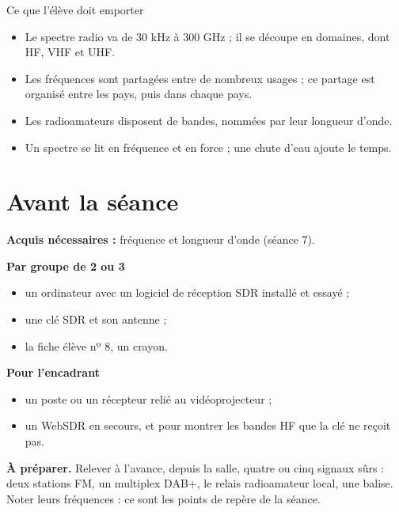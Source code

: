 \documentclass{BIRdoc}
\begin{document}

\begin{BIRencadre}{Ce que l'élève doit emporter}
\begin{itemize}
\item Le spectre radio va de 30 kHz à 300 GHz ; il se découpe en domaines, dont HF, VHF et UHF.
\item Les fréquences sont partagées entre de nombreux usages ; ce partage est organisé entre les pays, puis dans chaque pays.
\item Les radioamateurs disposent de bandes, nommées par leur longueur d'onde.
\item Un spectre se lit en fréquence et en force ; une chute d'eau ajoute le temps.
\end{itemize}
\end{BIRencadre}

\section*{Avant la séance}

\textbf{Acquis nécessaires :} fréquence et longueur d'onde (séance 7).

\begin{minipage}[t]{.48\linewidth}
\textbf{Par groupe de 2 ou 3}
\begin{itemize}
\item un ordinateur avec un logiciel de réception SDR installé et essayé ;
\item une clé SDR et son antenne ;
\item la fiche élève nº 8, un crayon.
\end{itemize}
\end{minipage}\hfill
\begin{minipage}[t]{.48\linewidth}
\textbf{Pour l'encadrant}
\begin{itemize}
\item un poste ou un récepteur relié au vidéoprojecteur ;
\item un WebSDR en secours, et pour montrer les bandes HF que la clé ne reçoit pas.
\end{itemize}
\end{minipage}

\medskip
\textbf{À préparer.} Relever à l'avance, depuis la salle, quatre ou cinq signaux
sûrs : deux stations FM, un multiplex DAB+, le relais radioamateur local, une
balise. Noter leurs fréquences : ce sont les points de repère de la séance.
\end{document}
